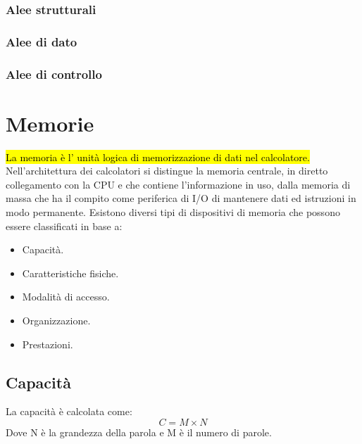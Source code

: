 \documentclass{article}
\begin{document}
\subsubsection{Alee strutturali}
\subsubsection{Alee di dato}
\subsubsection{Alee di controllo}


\newpage
\section{Memorie}
\hl{La memoria è l’ unità logica di memorizzazione di dati nel calcolatore.} Nell’architettura dei calcolatori si distingue la memoria centrale, in diretto collegamento con la CPU e che contiene l’informazione in uso, dalla memoria di massa che ha il compito come periferica di I/O di mantenere dati ed istruzioni in modo permanente.
Esistono diversi tipi di dispositivi di memoria che possono essere classificati in base a:
\begin{itemize}
    \item Capacità.
    \item Caratteristiche fisiche.
    \item Modalità di accesso.
    \item Organizzazione.
    \item Prestazioni.
\end{itemize}

\subsection{Capacità}
La capacità è calcolata come: 
\[ C = M \times N\]
Dove N è la grandezza della parola e M è il numero di parole.
\end{document}
